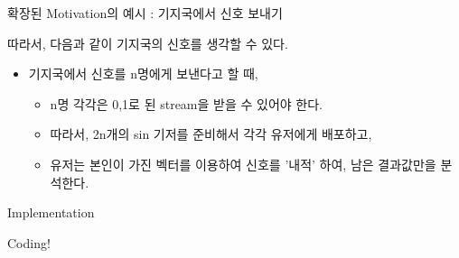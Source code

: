 \documentclass{beamer}
\begin{document}
\begin{frame}{확장된 Motivation의 예시 : 기지국에서 신호 보내기} 

따라서, 다음과 같이 기지국의 신호를 생각할 수 있다. 

\begin{itemize} 
\item 기지국에서 신호를 n명에게 보낸다고 할 때, 
\begin{itemize}
\item n명 각각은 0,1로 된 stream을 받을 수 있어야 한다. 
\item 따라서, 2n개의 sin 기저를 준비해서 각각 유저에게 배포하고, 
\item 유저는 본인이 가진 벡터를 이용하여 신호를 '내적' 하여, 남은 결과값만을 분석한다. 
\end{itemize}
\end{itemize}

\end{frame}


\begin{frame}{Implementation}

Coding! 

\end{frame}
\end{document}
